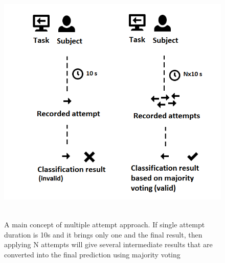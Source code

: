 \documentclass[12pt]{article}
\theoremstyle{definition}
\begin{document}
\begin{figure} [H]
\begin{center}
\includegraphics[height=12cm, width=1\textwidth]{main}
\caption{A main concept of multiple attempt approach. If single attempt duration is 10s and it brings only one and the final result, then applying N attempts will give several intermediate results that are converted into the final prediction using majority voting}
\label{fig:condorcet}
\end{center}
\end{figure}
\end{document}
